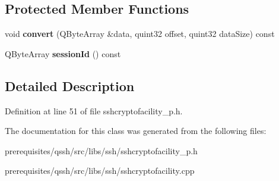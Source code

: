 \subsection*{Protected Member Functions}
\begin{DoxyCompactItemize}
\item 
\mbox{\label{class_q_ssh_1_1_internal_1_1_ssh_abstract_crypto_facility_a3111b855e8f2a6d5ae74fae06d816445}} 
void {\bfseries convert} (Q\+Byte\+Array \&data, quint32 offset, quint32 data\+Size) const
\item 
\mbox{\label{class_q_ssh_1_1_internal_1_1_ssh_abstract_crypto_facility_ab14b0acff2635075c78602483dc33a99}} 
Q\+Byte\+Array {\bfseries session\+Id} () const
\end{DoxyCompactItemize}


\subsection{Detailed Description}


Definition at line 51 of file sshcryptofacility\+\_\+p.\+h.



The documentation for this class was generated from the following files\+:\begin{DoxyCompactItemize}
\item 
prerequisites/qssh/src/libs/ssh/sshcryptofacility\+\_\+p.\+h\item 
prerequisites/qssh/src/libs/ssh/sshcryptofacility.\+cpp\end{DoxyCompactItemize}
